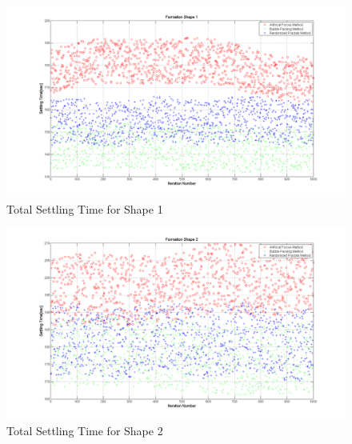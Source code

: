 \begin{figure}[H]
\caption{Total Settling Time for Shape 1} \label{settling_1}
\centerline{\includegraphics[scale = 0.35]{Total_Time_Shape_1}}
\end{figure} 
		
\begin{figure}[H]
\caption{Total Settling Time for Shape 2} \label{settling_2}
\centerline{\includegraphics[scale = 0.35]{Total_Time_Shape_2}}
\end{figure} 

